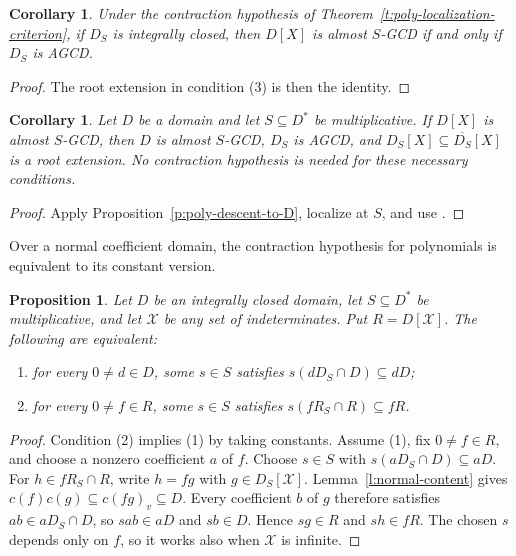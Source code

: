 \documentclass[11pt]{amsart}
\newtheorem{proposition}[theorem]{Proposition}
\newtheorem{corollary}[theorem]{Corollary}
\theoremstyle{definition}
\theoremstyle{remark}
\begin{document}
\begin{corollary}\label{c:poly-integrally-closed-localization}
Under the contraction hypothesis of
Theorem~\ref{t:poly-localization-criterion}, if $D_S$ is
integrally closed, then $D[X]$ is almost $S$-GCD if and only
if $D_S$ is AGCD.
\end{corollary}
\begin{proof}
The root extension in condition (3) is then the identity.
\end{proof}

\begin{corollary}\label{c:necessary-poly-conditions}
Let $D$ be a domain and let $S\subseteq D^\ast$ be multiplicative.
If $D[X]$ is almost $S$-GCD, then $D$ is almost $S$-GCD,
$D_S$ is AGCD, and $D_S[X]\subseteq\overline{D_S}[X]$ is a
root extension. No contraction hypothesis is needed for these
necessary conditions.
\end{corollary}
\begin{proof}
Apply Proposition~\ref{p:poly-descent-to-D}, localize at $S$,
and use \cite[Theorem~3.4]{ATZ}.
\end{proof}

Over a normal coefficient domain, the contraction hypothesis for
polynomials is equivalent to its constant version.

\begin{proposition}\label{p:normal-polynomial-contraction}
Let $D$ be an integrally closed domain, let $S\subseteq D^\ast$
be multiplicative, and let $\mathcal X$ be any set of
indeterminates. Put $R=D[\mathcal X]$. The following are equivalent:
\begin{enumerate}
\item for every $0\ne d\in D$, some $s\in S$ satisfies
$s(dD_S\cap D)\subseteq dD$;
\item for every $0\ne f\in R$, some $s\in S$ satisfies
$s(fR_S\cap R)\subseteq fR$.
\end{enumerate}
\end{proposition}
\begin{proof}
Condition (2) implies (1) by taking constants.
Assume (1), fix $0\ne f\in R$, and choose a nonzero coefficient
$a$ of $f$. Choose $s\in S$ with
$s(aD_S\cap D)\subseteq aD$.
For $h\in fR_S\cap R$, write $h=fg$ with
$g\in D_S[\mathcal X]$.
Lemma~\ref{l:normal-content} gives
$c(f)c(g)\subseteq c(fg)_v\subseteq D$.
Every coefficient $b$ of $g$ therefore satisfies
$ab\in aD_S\cap D$, so $sab\in aD$ and $sb\in D$.
Hence $sg\in R$ and $sh\in fR$.
The chosen $s$ depends only on $f$, so it works also when
$\mathcal X$ is infinite.
\end{proof}
\end{document}
